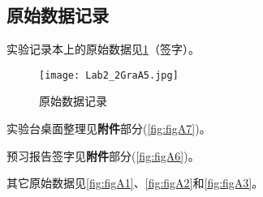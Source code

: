 \documentclass[dvipsnames, svgnames,a4paper,11pt]{article}
\begin{document}
	
	\clearpage
	\subsection{原始数据记录}
	实验记录本上的原始数据见\cref{fig:figA5}（签字）。
	
	\begin{figure}[htbp]
		\centering
		\texttt{[image: Lab2\_2GraA5.jpg]}
		\caption{原始数据记录}
		\label{fig:figA5}
	\end{figure}
	
	实验台桌面整理见\textbf{附件}部分(\cref{fig:figA7})。
	
	预习报告签字见\textbf{附件}部分(\cref{fig:figA6})。
	
	其它原始数据见\cref{fig:figA1}、\cref{fig:figA2}和\cref{fig:figA3}。
	
\end{document}
